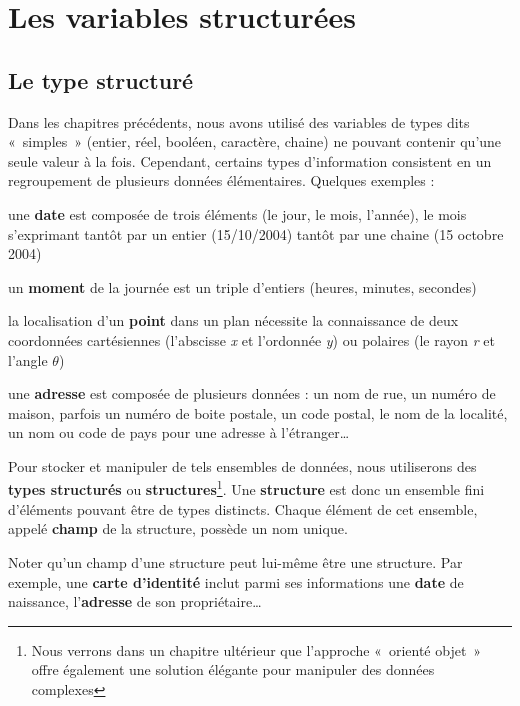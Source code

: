 \chapter{Les variables structurées}

\section{Le type structuré}

	Dans les chapitres précédents, nous avons utilisé des variables de types
	dits «~simples~» (entier, réel, booléen, caractère, chaine) ne pouvant
	contenir qu’une seule valeur à la fois. Cependant, certains types
	d’information consistent en un regroupement de plusieurs données
	élémentaires. Quelques exemples :

	\begin{liste}
	\item {
		une \textbf{date} est composée de trois éléments (le jour, le mois,
		l’année), le mois s’exprimant tantôt par un entier (15/10/2004) tantôt
		par une chaine (15 octobre 2004)}
	\item {
		un \textbf{moment} de la journée est un triple d’entiers (heures,
		minutes, secondes)}
	\item {
		la localisation d’un \textbf{point} dans un plan nécessite la
		connaissance de deux coordonnées cartésiennes (l’abscisse \textit{x} et
		l’ordonnée \textit{y}) ou polaires (le rayon \textit{r} et l’angle
		\textit{$\theta $})}
	\item {
		une \textbf{adresse }est composée de plusieurs données : un nom de rue,
		un numéro de maison, parfois un numéro de boite postale, un code
		postal, le nom de la localité, un nom ou code de pays pour une adresse
		à l’étranger\dots}
	\end{liste}

	Pour stocker et manipuler de tels ensembles de données, nous utiliserons
	des \textbf{types structurés} ou \textbf{structures}\footnote{Nous
	verrons dans un chapitre ultérieur que l'approche
	«~orienté objet~» offre également une solution élégante pour manipuler
	des données complexes}. Une \textbf{structure} est donc un ensemble
	fini d’éléments pouvant être de types distincts. Chaque élément de cet
	ensemble, appelé \textbf{champ} de la structure, possède un nom unique.
	
	Noter qu’un champ d’une structure peut lui-même être une structure. Par
	exemple, une \textbf{carte d’identité} inclut parmi ses informations
	une \textbf{date} de naissance, l’\textbf{adresse} de son
	propriétaire\dots

